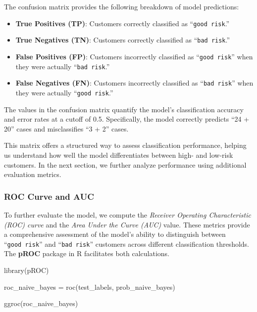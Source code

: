 \documentclass[
  11pt,
]{book}
\makeatletter
\newenvironment{Shaded}{}{}
\newcommand{\FunctionTok}[1]{#1}
\newcommand{\NormalTok}[1]{#1}
\newcommand{\OtherTok}[1]{\textcolor[rgb]{0.39,0.39,0.39}{#1}}
\providecommand{\tightlist}{%
  \setlength{\itemsep}{0pt}\setlength{\parskip}{0pt}}
\newenvironment{kframe}{%
\medskip{}
\setlength{\fboxsep}{.8em}
 \def\at@end@of@kframe{}%
 \ifinner\ifhmode%
  \def\at@end@of@kframe{\end{minipage}}%
  \begin{minipage}{\columnwidth}%
 \fi\fi%
 \def\FrameCommand##1{\hskip\@totalleftmargin \hskip-\fboxsep
 \colorbox{shadecolor}{##1}\hskip-\fboxsep
     \hskip-\linewidth \hskip-\@totalleftmargin \hskip\columnwidth}%
 \MakeFramed {\advance\hsize-\width
   \@totalleftmargin\z@ \linewidth\hsize
   \@setminipage}}%
 {\par\unskip\endMakeFramed%
 \at@end@of@kframe}
\renewenvironment{Shaded}{\begin{kframe}}{\end{kframe}}
\theoremstyle{definition}
\theoremstyle{definition}
\theoremstyle{definition}
\theoremstyle{definition}
\theoremstyle{remark}
\makeatother
\begin{document}
The confusion matrix provides the following breakdown of model predictions:

\begin{itemize}
\tightlist
\item
  \textbf{True Positives (TP)}: Customers correctly classified as ``\texttt{good\ risk}.''\\
\item
  \textbf{True Negatives (TN)}: Customers correctly classified as ``\texttt{bad\ risk}.''\\
\item
  \textbf{False Positives (FP)}: Customers incorrectly classified as ``\texttt{good\ risk}'' when they were actually ``\texttt{bad\ risk}.''\\
\item
  \textbf{False Negatives (FN)}: Customers incorrectly classified as ``\texttt{bad\ risk}'' when they were actually ``\texttt{good\ risk}.''
\end{itemize}

The values in the confusion matrix quantify the model's classification accuracy and error rates at a cutoff of 0.5. Specifically, the model correctly predicts ``24 + 20'' cases and misclassifies ``3 + 2'' cases.

This matrix offers a structured way to assess classification performance, helping us understand how well the model differentiates between high- and low-risk customers. In the next section, we further analyze performance using additional evaluation metrics.

\subsubsection*{ROC Curve and AUC}\label{roc-curve-and-auc-1}


To further evaluate the model, we compute the \emph{Receiver Operating Characteristic (ROC) curve} and the \emph{Area Under the Curve (AUC)} value. These metrics provide a comprehensive assessment of the model's ability to distinguish between ``\texttt{good\ risk}'' and ``\texttt{bad\ risk}'' customers across different classification thresholds. The \textbf{pROC} package in R facilitates both calculations.

\begin{Shaded}
\begin{Highlighting}[]
\FunctionTok{library}\NormalTok{(pROC)          }

\NormalTok{roc\_naive\_bayes }\OtherTok{=} \FunctionTok{roc}\NormalTok{(test\_labels, prob\_naive\_bayes)}

\FunctionTok{ggroc}\NormalTok{(roc\_naive\_bayes)}
\end{Highlighting}
\end{Shaded}
\end{document}
